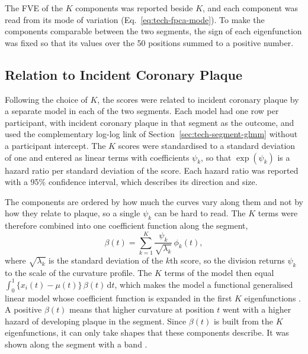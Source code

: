 The FVE of the $K$ components was reported beside $K$, and each component was read from its mode of variation (Eq.~\eqref{eq:tech-fpca-mode}).
To make the components comparable between the two segments, the sign of each eigenfunction was fixed so that its values over the 50 positions summed to a positive number.

\subsection{Relation to Incident Coronary Plaque}

Following the choice of $K$, the scores were related to incident coronary plaque by a separate model in each of the two segments.
Each model had one row per participant, with incident coronary plaque in that segment as the outcome, and used the complementary log-log link of Section~\ref{sec:tech-segment-glmm} without a participant intercept.
The $K$ scores were standardised to a standard deviation of one and entered as linear terms with coefficients $\psi_k$, so that $\exp(\psi_k)$ is a hazard ratio per standard deviation of the score.
Each hazard ratio was reported with a 95\% confidence interval, which describes its direction and size.

The components are ordered by how much the curves vary along them and not by how they relate to plaque, so a single $\psi_k$ can be hard to read.
The $K$ terms were therefore combined into one coefficient function along the segment,
\begin{equation}
  \beta(t) = \sum_{k=1}^{K} \frac{\psi_k}{\sqrt{\lambda_k}}\, \phi_k(t) ,
  \label{eq:method-fpca-beta}
\end{equation}
where $\sqrt{\lambda_k}$ is the standard deviation of the $k$th score, so the division returns $\psi_k$ to the scale of the curvature profile.
The $K$ terms of the model then equal $\int_0^1 \{ x_i(t) - \mu(t) \}\, \beta(t)\, \mathrm{d}t$, which makes the model a functional generalised linear model whose coefficient function is expanded in the first $K$ eigenfunctions \cite{wang2016fda}.
A positive $\beta(t)$ means that higher curvature at position $t$ went with a higher hazard of developing plaque in the segment.
Since $\beta(t)$ is built from the $K$ eigenfunctions, it can only take shapes that these components describe.
It was shown along the segment with a band .
